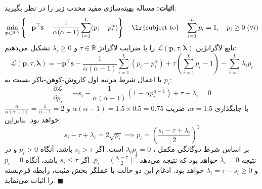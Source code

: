 \textbf{اثبات:} مساله بهینه‌سازی مقید محدب زیر را در نظر بگیرید:
\begin{equation}
\min_{\mathbf{p} \in \mathbb{R}^L} \left\{ -\mathbf{p}^\top \mathbf{s} - \frac{1}{\alpha(\alpha-1)} \sum_{i=1}^L (p_i - p_i^\alpha) \right\} \quad \text{\lr{subject to}} \quad \sum_{i=1}^L p_i = 1, \quad p_i \ge 0 \; (\forall i)
\end{equation}
تابع لاگرانژین $\mathcal{L}(\mathbf{p}, \tau, \boldsymbol{\lambda})$ را با ضرایب لاگرانژ $\tau \in \mathbb{R}$ و $\lambda_i \ge 0$ تشکیل می‌دهیم:
\begin{equation}
\mathcal{L}(\mathbf{p}, \tau, \boldsymbol{\lambda}) = -\mathbf{p}^\top \mathbf{s} - \frac{1}{\alpha(\alpha-1)} \sum_{i=1}^L (p_i - p_i^\alpha) + \tau \left( \sum_{i=1}^L p_i - 1 \right) - \sum_{i=1}^L \lambda_i p_i
\end{equation}
با اعمال شرط مرتبه اول کاروش-کوهن-تاکر  نسبت به $p_i$:
\begin{equation}
\frac{\partial \mathcal{L}}{\partial p_i} = -s_i - \frac{1}{\alpha(\alpha-1)} (1 - \alpha p_i^{\alpha-1}) + \tau - \lambda_i = 0
\end{equation}
با جایگذاری $\alpha = 1.5$، ضریب $\alpha(\alpha-1) = 1.5 \times 0.5 = 0.75$ و $\frac{\alpha}{\alpha(\alpha-1)} = \frac{1}{\alpha-1} = 2$ خواهد بود. بنابراین:
\begin{equation}
s_i - \tau + \lambda_i = 2 \sqrt{p_i} \implies p_i = \left( \frac{s_i - \tau + \lambda_i}{2} \right)^2
\end{equation}
بر اساس شرط دوگانگی مکمل ، $\lambda_i p_i = 0$ است. اگر $s_i > \tau$ باشد، آنگاه $p_i > 0$ و در نتیجه $\lambda_i = 0$ خواهد بود که نتیجه می‌دهد $p_i = \left( \frac{s_i - \tau}{2} \right)^2$. اگر $s_i \le \tau$ باشد، آنگاه $p_i = 0$ و $\lambda_i = \tau - s_i \ge 0$ خواهد بود. ادغام این دو حالت با عملگر بخش مثبت، رابطه فرم‌بسته را اثبات می‌نماید. $\blacksquare$


